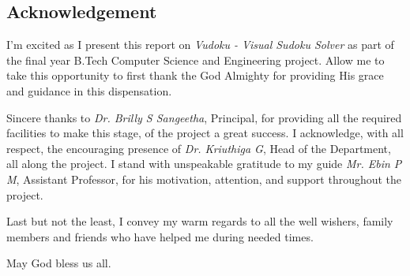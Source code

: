 \documentclass[12pt, a4paper]{report}
\begin{document}
\newpage
\vspace*{\fill}
\begin{center}
    \section*{Acknowledgement}
\end{center}

I'm excited as I present this report on \emph{Vudoku - Visual Sudoku Solver} as part of the final year B.Tech Computer Science and Engineering project. Allow me to take this opportunity to first thank the God Almighty for providing His grace and guidance in this dispensation.

Sincere thanks to \emph{Dr. Brilly S Sangeetha}, Principal, for providing all the required facilities to make this stage, of the project a great success. I acknowledge, with all respect, the encouraging presence of \emph{Dr. Kriuthiga G}, Head of the Department, all along the project. I stand with unspeakable gratitude to my guide \emph{Mr. Ebin P M}, Assistant Professor, for his motivation, attention, and support throughout the project.

Last but not the least, I convey my warm regards to all the well wishers, family members and friends who have helped me during needed times.

\vspace{0.5em}
\begin{center}
    May God bless us all.
\end{center}
\vspace*{\fill}
\end{document}
